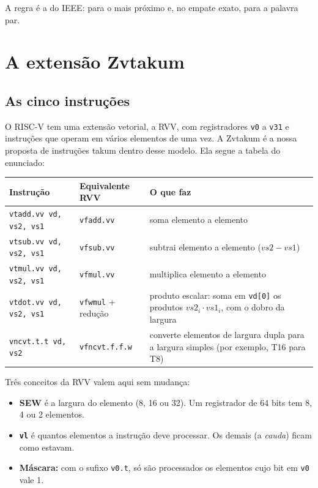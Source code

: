 \documentclass[11pt,a4paper]{article}
\newcommand{\code}[1]{\texttt{#1}}
\begin{document}


A regra é a do IEEE: para o mais próximo e, no empate exato, para a palavra par.

\section{A extensão Zvtakum}

\subsection{As cinco instruções}

O RISC-V tem uma extensão vetorial, a RVV, com registradores \code{v0} a \code{v31} e instruções que
operam em vários elementos de uma vez. A Zvtakum é a nossa proposta de instruções takum dentro desse
modelo. Ela segue a tabela do enunciado:

\begin{center}
\begin{tabularx}{\linewidth}{llX}
\toprule
Instrução & Equivalente RVV & O que faz \\
\midrule
\code{vtadd.vv vd, vs2, vs1} & \code{vfadd.vv} & soma elemento a elemento \\
\code{vtsub.vv vd, vs2, vs1} & \code{vfsub.vv} & subtrai elemento a elemento ($vs2 - vs1$) \\
\code{vtmul.vv vd, vs2, vs1} & \code{vfmul.vv} & multiplica elemento a elemento \\
\code{vtdot.vv vd, vs2, vs1} & \code{vfwmul} + redução & produto escalar: soma em \code{vd[0]} os produtos
   $vs2_i\cdot vs1_i$, com o dobro da largura \\
\code{vncvt.t.t vd, vs2} & \code{vfncvt.f.f.w} & converte elementos de largura dupla para a largura
   simples (por exemplo, T16 para T8) \\
\bottomrule
\end{tabularx}
\end{center}

Três conceitos da RVV valem aqui sem mudança:
\begin{itemize}[nosep]
  \item \textbf{SEW} é a largura do elemento (8, 16 ou 32). Um registrador de 64 bits tem 8, 4 ou 2
        elementos.
  \item \textbf{\code{vl}} é quantos elementos a instrução deve processar. Os demais (a \emph{cauda})
        ficam como estavam.
  \item \textbf{Máscara:} com o sufixo \code{v0.t}, só são processados os elementos cujo bit em \code{v0}
        vale 1.
\end{itemize}
\end{document}

